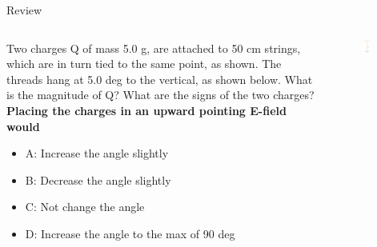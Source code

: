 \documentclass{beamer}
\begin{document}
\begin{frame}{Review}
\begin{columns}[T]
\begin{column}{0.5\textwidth}
\small
Two charges Q of mass 5.0 g, are attached to 50 cm strings, which are in turn tied to the same point, as shown.  The threads hang at 5.0 deg to the vertical, as shown below. What is the magnitude of Q? What are the signs of the two charges? \\ \vspace{0.5cm}
\textbf{Placing the charges in an upward pointing E-field would}
\begin{itemize}
\item A: Increase the angle slightly
\item B: Decrease the angle slightly
\item C: Not change the angle
\item D: Increase the angle to the max of 90 deg
\end{itemize}
\end{column}
\begin{column}{0.5\textwidth}
\begin{figure}
\centering
\includegraphics[width=0.5\textwidth]{ex1.jpeg}
\caption{\label{fig:ex1}}
\end{figure}
\end{column}
\end{columns}
\end{frame}
\end{document}
